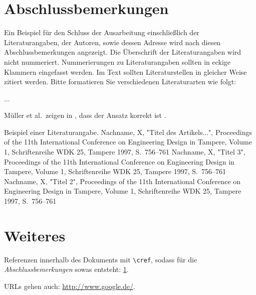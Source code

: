 \documentclass[12pt,paper=a4]{scrartcl}
\begin{document}
\pagebreak
\section{Abschlussbemerkungen}\label{sec:abschluss}
Ein Beispiel für den Schluss der Ausarbeitung einschließlich der Literaturangaben, der Autoren, sowie dessen Adresse wird nach diesen Abschlussbemerkungen angezeigt.
Die Überschrift der Literaturangaben wird nicht nummeriert.
Nummerierungen zu Literaturangaben sollten in eckige Klammern eingefasst werden.
Im Text sollten Literaturstellen in gleicher Weise zitiert werden.
Bitte formatieren Sie verschiedenen Literaturarten wie folgt:

...

Müller et al.\ zeigen in \cite{article}, dass der Ansatz korrekt ist \cite{inproceeding, inproceeding2, inproceeding3}.

\begin{thebibliography}{}
	Beispiel einer Literaturangabe.
	Nachname, X, "Titel des Artikels...", Proceedings of the 11th International Conference on Engineering Design in Tampere, Volume 1, Schriftenreihe WDK 25, Tampere 1997, S.\ 756--761
	Nachname, X, "Titel 3", Proceedings of the 11th International Conference on Engineering Design in Tampere, Volume 1, Schriftenreihe WDK 25, Tampere 1997, S.\ 756--761
	Nachname, X, "Titel 2", Proceedings of the 11th International Conference on Engineering Design in Tampere, Volume 1, Schriftenreihe WDK 25, Tampere 1997, S.\ 756--761
\end{thebibliography}




\pagebreak

\section{Weiteres}
Referenzen innerhalb des Dokuments mit \texttt{\textbackslash cref}, sodass für die \textit{Abschlussbemerkungen} sowas entsteht: \cref{sec:abschluss}.

URLs gehen auch: \url{http://www.google.de/}.
\end{document}
